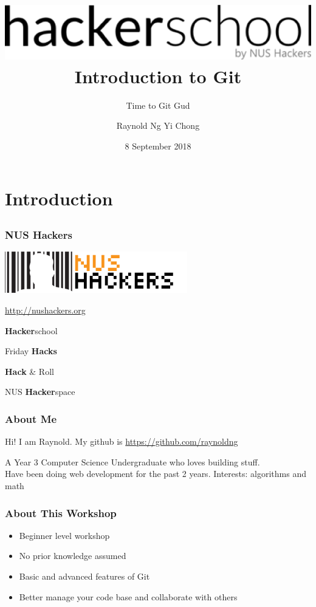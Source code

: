 \documentclass[12pt]{beamer}
\title{ \includegraphics[width=0.5\linewidth]{hackerschool} \\ Introduction  to Git}
\subtitle{Time to Git Gud}
\author{Raynold Ng Yi Chong}
\date{8 September 2018}
\begin{document}
\frame{\titlepage}

\section{Introduction}
\subsection{}

\begin{frame}
\frametitle{NUS Hackers}

\begin{center}	
\includegraphics[width=0.5\linewidth]{NUSHackers}

\url{http://nushackers.org}
\end{center}

\begin{center}
	\textbf{Hacker}school
	
	Friday \textbf{Hacks}
	
	\textbf{Hack} \& Roll
	
	NUS \textbf{Hacker}space
\end{center}

\end{frame}

\begin{frame}
\frametitle{About Me}

Hi! I am Raynold. My github is \url{https://github.com/raynoldng}

A Year 3 Computer Science Undergraduate who loves building stuff.\\

Have been doing web development for the past 2 years. Interests: algorithms and math

\end{frame}

\begin{frame}
\frametitle{About This Workshop}
\begin{itemize}
	\item Beginner level workshop
	\item No prior knowledge assumed
	\item Basic and advanced features of Git
	\item Better manage your code base and collaborate with others
\end{itemize}
\end{frame}
\end{document}
